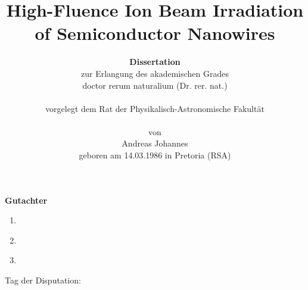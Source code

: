 
\title{High-Fluence Ion Beam Irradiation of Semiconductor Nanowires}


\author{\textbf{Dissertation}\\
zur Erlangung des akademischen Grades\\
doctor rerum naturalium (Dr. rer. nat.)\\
\\
vorgelegt dem Rat der Physikalisch-Astronomische Fakultät\\
\\
von\\
Andreas Johannes\\
geboren am 14.03.1986 in Pretoria (RSA)}
\date{}
\maketitle

\clearpage
\mbox{}

\vspace{12cm}
\textbf{\large{Gutachter}}

\vspace{0.5cm}
\begin{enumerate}

\item \underline{\hspace{7cm}}
\\
\item \underline{\hspace{7cm}}
\\
\item \underline{\hspace{7cm}}
\\
\end{enumerate}
\vspace{1.5cm}
Tag der Disputation: \underline{\hspace{7cm}}
